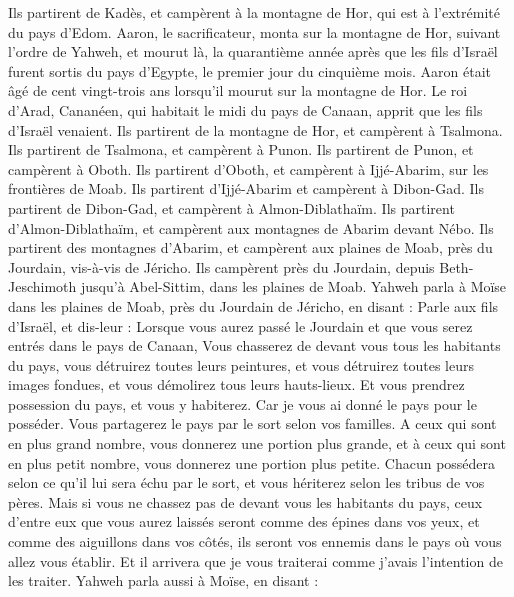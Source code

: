 \begin{multicols}{2}
Ils partirent de Kadès, et campèrent à la montagne de Hor, qui est à l’extrémité du pays d'Edom.
Aaron, le sacrificateur, monta sur la montagne de Hor, suivant l’ordre de Yahweh, et mourut là, la quarantième année après que les fils d'Israël furent sortis du pays d'Egypte, le premier jour du cinquième mois.
Aaron était âgé de cent vingt-trois ans lorsqu’il mourut sur la montagne de Hor.
Le roi d’Arad, Cananéen, qui habitait le midi du pays de Canaan, apprit que les fils d'Israël venaient.
Ils partirent de la montagne de Hor, et campèrent à Tsalmona.
Ils partirent de Tsalmona, et campèrent à Punon.
Ils partirent de Punon, et campèrent à Oboth.
Ils partirent d'Oboth, et campèrent à Ijjé-Abarim, sur les frontières de Moab.
Ils partirent d’Ijjé-Abarim et campèrent à Dibon-Gad.
Ils partirent de Dibon-Gad, et campèrent à Almon-Diblathaïm.
Ils partirent d’Almon-Diblathaïm, et campèrent aux montagnes de Abarim devant Nébo.
Ils partirent des montagnes d’Abarim, et campèrent aux plaines de Moab, près du Jourdain, vis-à-vis de Jéricho.
Ils campèrent près du Jourdain, depuis Beth-Jeschimoth jusqu'à Abel-Sittim, dans les plaines de Moab.
Yahweh parla à Moïse dans les plaines de Moab, près du Jourdain de Jéricho, en disant :
Parle aux fils d’Israël, et dis-leur : Lorsque vous aurez passé le Jourdain et que vous serez entrés dans le pays de Canaan,
Vous chasserez de devant vous tous les habitants du pays, vous détruirez toutes leurs peintures, et vous détruirez toutes leurs images fondues, et vous démolirez tous leurs hauts-lieux.
Et vous prendrez possession du pays, et vous y habiterez. Car je vous ai donné le pays pour le posséder.
Vous partagerez le pays par le sort selon vos familles. A ceux qui sont en plus grand nombre, vous donnerez une portion plus grande, et à ceux qui sont en plus petit nombre, vous donnerez une portion plus petite. Chacun possédera selon ce qu'il lui sera échu par le sort, et vous hériterez selon les tribus de vos pères.
Mais si vous ne chassez pas de devant vous les habitants du pays, ceux d'entre eux que vous aurez laissés seront comme des épines dans vos yeux, et comme des aiguillons dans vos côtés, ils seront vos ennemis dans le pays où vous allez vous établir.
Et il arrivera que je vous traiterai comme j'avais l’intention de les traiter.
\VerseOne{}Yahweh parla aussi à Moïse, en disant :

\end{multicols}
